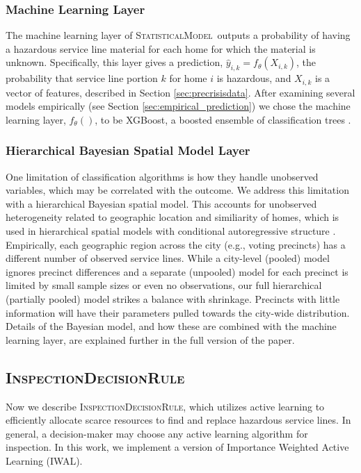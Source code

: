 \documentclass[sigconf]{acmart}
\def\statmodel{\textsc{StatisticalModel}\xspace}
\def\druleHVI{\textsc{InspectionDecisionRule}\xspace}
\begin{document}
\subsubsection{Machine Learning Layer}

The machine learning layer of \statmodel\ outputs a probability of having a hazardous service line material for each home for which the material is unknown. Specifically, this layer gives a prediction, $\hat y_{i,k} = f_\theta(X_{i,k})$,
the probability that service line portion $k$ for home $i$ is hazardous, and $X_{i,k}$ is a vector of features, described in Section \ref{sec:precrisisdata}. After examining several models empirically (see Section \ref{sec:empirical_prediction}) we chose the machine learning layer, $f_{\theta}()$, to be XGBoost, a boosted ensemble of classification trees \cite{chen2016xgboost}.


\subsubsection{Hierarchical Bayesian Spatial Model Layer} \label{sec:HBayesModel}

One limitation of classification algorithms is how they handle unobserved variables, which may be correlated with the outcome. We address this limitation with a hierarchical Bayesian spatial model. This accounts for unobserved heterogeneity related to geographic location and similiarity of homes, which is used in hierarchical spatial models with conditional autoregressive structure \citep{gelman2014bayesian,gelfand2003proper,lee2011comparison,lee2013carbayes}. Empirically, each geographic region across the city (e.g., voting precincts) has a different number of observed service lines. While a city-level (pooled) model ignores precinct differences and a separate (unpooled) model for each precinct is limited by small sample sizes or even no observations, our full hierarchical (partially pooled) model strikes a balance with shrinkage. Precincts with little information will have their parameters pulled towards the city-wide distribution. Details of the Bayesian model, and how these are combined with the machine learning layer, are explained further in the full version of the paper.


\subsection{\druleHVI}
\label{sec:alg_for_selecting}


Now we describe \druleHVI, which utilizes active learning \cite{balcan2013statistical,balcan2010true,liu2008active} to efficiently allocate scarce resources to find and replace hazardous service lines. In general, a decision-maker may choose any active learning algorithm for inspection. In this work, we implement a version of Importance Weighted Active Learning (IWAL).
\end{document}

